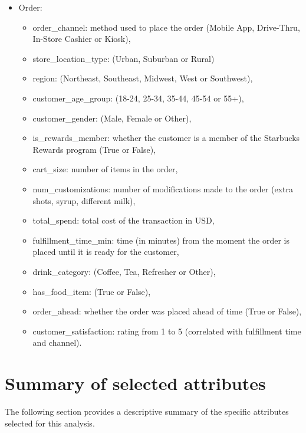 \documentclass[12pt]{report}
\begin{document}
\begin{itemize}
    \item Order:
          \begin{itemize}
              \item order\_channel: method used to place the order (Mobile App, Drive-Thru, In-Store Cashier or Kiosk),
              \item store\_location\_type: (Urban, Suburban or Rural)
              \item region: (Northeast, Southeast, Midwest, West or Southwest),
              \item customer\_age\_group: (18-24, 25-34, 35-44, 45-54 or 55+),
              \item customer\_gender: (Male, Female or Other),
              \item is\_rewards\_member: whether the customer is a member of the Starbucks Rewards program (True or False),
              \item cart\_size: number of items in the order,
              \item num\_customizations: number of modifications made to the order (extra shots, syrup, different milk),
              \item total\_spend: total cost of the transaction in USD\@,
              \item fulfillment\_time\_min: time (in minutes) from the moment the order is placed until it is ready for the customer,
              \item drink\_category: (Coffee, Tea, Refresher or Other),
              \item has\_food\_item: (True or False),
              \item order\_ahead: whether the order was placed ahead of time (True or False),
              \item customer\_satisfaction: rating from 1 to 5 (correlated with fulfillment time and channel).

          \end{itemize}
\end{itemize}



\section{Summary of selected attributes}
The following section provides a descriptive summary of the specific attributes selected for this analysis.

\end{document}
